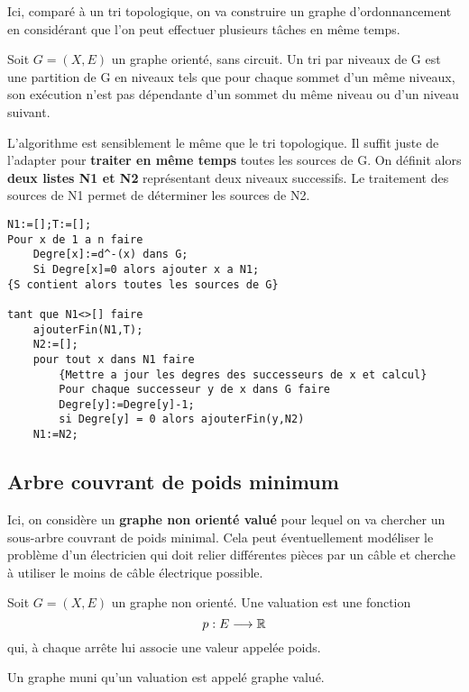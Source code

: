 Ici, comparé à un tri topologique, on va construire un graphe d'ordonnancement en considérant que l'on peut effectuer plusieurs 
tâches en même temps. 

\begin{definition}
    Soit $G = (X,E)$ un graphe orienté, sans circuit. 
    Un tri par niveaux de G est une partition de G en niveaux tels que pour chaque sommet d'un même niveaux, 
    son exécution n'est pas dépendante d'un sommet du même niveau ou d'un niveau suivant. 
\end{definition}

L'algorithme est sensiblement le même que le tri topologique. Il suffit juste de l'adapter 
pour \textbf{traiter en même temps} toutes les sources de G. 
On définit alors \textbf{deux listes N1 et N2} représentant deux niveaux successifs. 
Le traitement des sources de N1 permet de déterminer les sources de N2. 

\begin{lstlisting}
N1:=[];T:=[];
Pour x de 1 a n faire
    Degre[x]:=d^-(x) dans G;
    Si Degre[x]=0 alors ajouter x a N1;
{S contient alors toutes les sources de G}

tant que N1<>[] faire
    ajouterFin(N1,T);
    N2:=[];
    pour tout x dans N1 faire
        {Mettre a jour les degres des successeurs de x et calcul}
        Pour chaque successeur y de x dans G faire
        Degre[y]:=Degre[y]-1;
        si Degre[y] = 0 alors ajouterFin(y,N2)
    N1:=N2;
\end{lstlisting}


\subsection{Arbre couvrant de poids minimum}

Ici, on considère un \textbf{graphe non orienté valué }pour lequel on va chercher un sous-arbre couvrant de poids minimal. 
Cela peut éventuellement modéliser le problème d'un électricien qui doit relier différentes pièces par un câble 
et cherche à utiliser le moins de câble électrique possible. 

\begin{definition}[Valuation]
    Soit $G = (X,E)$ un graphe non orienté. Une valuation est une fonction 
    \[ p : E \longrightarrow \mathbb{R} \] 
    qui, à chaque arrête lui associe une valeur appelée poids. 

    Un graphe muni qu'un valuation est appelé graphe valué. 
\end{definition}

